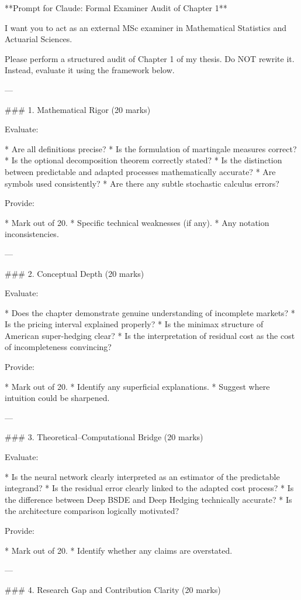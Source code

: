 **Prompt for Claude: Formal Examiner Audit of Chapter 1**

I want you to act as an external MSc examiner in Mathematical Statistics and Actuarial Sciences.

Please perform a structured audit of Chapter 1 of my thesis. Do NOT rewrite it. Instead, evaluate it using the framework below.

---

### 1. Mathematical Rigor (20 marks)

Evaluate:

* Are all definitions precise?
* Is the formulation of martingale measures correct?
* Is the optional decomposition theorem correctly stated?
* Is the distinction between predictable and adapted processes mathematically accurate?
* Are symbols used consistently?
* Are there any subtle stochastic calculus errors?

Provide:

* Mark out of 20.
* Specific technical weaknesses (if any).
* Any notation inconsistencies.

---

### 2. Conceptual Depth (20 marks)

Evaluate:

* Does the chapter demonstrate genuine understanding of incomplete markets?
* Is the pricing interval explained properly?
* Is the minimax structure of American super-hedging clear?
* Is the interpretation of residual cost as the cost of incompleteness convincing?

Provide:

* Mark out of 20.
* Identify any superficial explanations.
* Suggest where intuition could be sharpened.

---

### 3. Theoretical–Computational Bridge (20 marks)

Evaluate:

* Is the neural network clearly interpreted as an estimator of the predictable integrand?
* Is the residual error clearly linked to the adapted cost process?
* Is the difference between Deep BSDE and Deep Hedging technically accurate?
* Is the architecture comparison logically motivated?

Provide:

* Mark out of 20.
* Identify whether any claims are overstated.

---

### 4. Research Gap and Contribution Clarity (20 marks)

